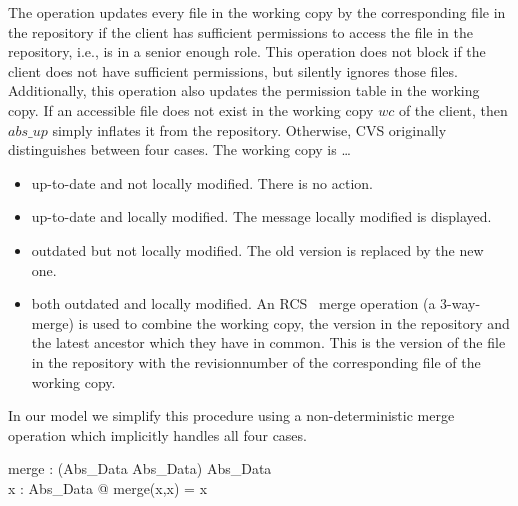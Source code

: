 The  operation updates every file in the working copy by the
corresponding file in the repository if the client has sufficient permissions to
access the file in the repository, i.e., is in a senior enough role. This
operation does not block if the client does not have sufficient permissions, but
silently ignores those files.  Additionally, this operation also updates the
permission table in the working copy.  If an accessible file does not exist in
the working copy $wc$ of the client, then $abs\_up$ simply inflates it from the
repository. Otherwise, CVS  originally distinguishes between four cases. The
working copy is \ldots
\begin{itemize}
  \item up-to-date and not locally modified. There is no action.
  \item up-to-date and locally modified. The message \glqq locally
    modified\grqq{} is displayed.
  \item outdated but not locally modified. The old version is replaced by the
    new one.
  \item both outdated and locally modified. An RCS~\cite{tichy85rcs} merge
    operation (a 3-way-merge) is used to combine the working copy, the version
    in the repository and the latest ancestor which they have in common. This is
    the version of the file in the repository with the revisionnumber of the
    corresponding file of the working copy.
\end{itemize}

In our model we simplify this procedure using a non-deterministic merge
operation which implicitly handles all four cases.

\begin{doc}{3}
  \begin{axdef}
    merge : (Abs\_Data \cross Abs\_Data) \fun Abs\_Data \\
    \where
    \forall x : Abs\_Data @ merge(x,x) = x \\
  \end{axdef}
\end{doc} 

